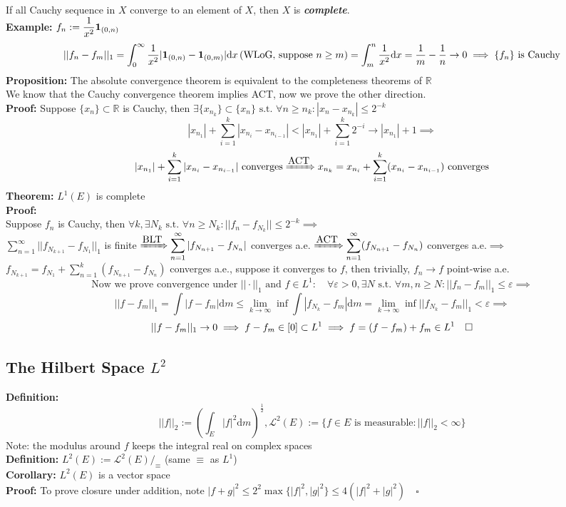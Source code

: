 \documentclass{article}
\newcommand{\R}{\mathbb{R}}
\newcommand{\sumninf}{\displaystyle\sum_{n=1}^\infty}
\newcommand{\sumik}{\displaystyle\sum_{i=1}^k}
\newcommand{\sumnk}{\displaystyle\sum_{n=1}^k}
\newcommand{\limkinf}{\displaystyle\lim_{k\to\infty}}
\newcommand{\st}{\mbox{ s.t. }}
\newcommand{\0}{{\bf{0}}}
\newcommand{\1}{{\bf{1}}}
\newcommand{\dif}{\mbox{d}}
\begin{document}
If all Cauchy sequence in $X$ converge to an element of $X$, then $X$ is \textit{\textbf{complete}}.\\
\textbf{Example:} $f_n:=\dfrac{1}{x^2}\1_{(0,n)}$
$$||f_n-f_m||_1=\int_0^\infty\frac{1}{x^2}|\1_{(0,n)}-\1_{(0,m)}|\dif x\,(\mbox{WLoG, suppose }n\geq m)=\int_m^n\frac{1}{x^2}\dif x=\frac{1}{m}-\frac{1}{n}\to0\implies\{f_n\}\mbox{ is Cauchy}$$
\textbf{Proposition:} The absolute convergence theorem is equivalent to the completeness theorems of $\R$\\
We know that the Cauchy convergence theorem implies ACT, now we prove the other direction.\\
\textbf{Proof:} Suppose $\{x_n\}\subset\R$ is Cauchy, then $\exists\{x_{n_k}\}\subset\{x_n\}\st\forall n\geq n_k:|x_n-x_{n_k}|\le2^{-k}$
$$|x_{n_1}|+\sumik|x_{n_i}-x_{n_{i-1}}|<|x_{n_1}|+\sumik2^{-i}\to|x_{n_1}|+1\implies$$
$$|x_{n_1}|+\sumik|x_{n_i}-x_{n_{i-1}}|\mbox{ converges}\xRightarrow{\mbox{ACT}}x_{n_k}=x_{n_i}+\sumik(x_{n_i}-x_{n_{i-1}})\mbox{ converges}$$
\textbf{Theorem:} $L^1(E)$ is complete\\
\textbf{Proof:}\\
Suppose $f_n$ is Cauchy, then $\forall k,\exists N_k\st\forall n\geq N_k:||f_n-f_{N_k}||\le2^{-k}\implies$\\
$\sumninf||f_{N_{k+1}}-f_{N_1}||_1$ is finite $\xRightarrow{\mbox{BLT}}\sumninf|f_{N_{n+1}}-f_{N_n}|$ converges a.e. $\xRightarrow{\mbox{ACT}}\sumninf(f_{N_{n+1}}-f_{N_n})$ converges a.e.$\implies$\\
$f_{N_{k+1}}=f_{N_1}+\sumnk(f_{N_{n+1}}-f_{N_n})$ converges a.e., suppose it converges to $f$, then trivially, $f_n\to f$ point-wise a.e.
$$\mbox{Now we prove convergence under }||\cdot||_1\mbox{ and }f\in L^1:\quad\forall\varepsilon>0,\exists N\st\forall m,n\geq N:||f_n-f_m||_1\le\varepsilon\implies$$
$$||f-f_m||_1=\int|f-f_m|\dif m\le\limkinf\inf\int|f_{N_k}-f_m|\dif m=\limkinf\inf||f_{N_k}-f_m||_1<\varepsilon\implies$$
$$||f-f_m||_1\to0\implies f-f_m\in[0]\subset L^1\implies f=(f-f_m)+f_m\in L^1\quad\null\square$$
\subsection{The Hilbert Space $L^2$}
\textbf{Definition:}
$$||f||_2:=(\int_E|f|^2\dif m)^\frac{1}{2},\mathcal{L}^2(E):=\{f\in E\mbox{ is measurable}:||f||_2<\infty\}$$
\null\hfill{Note: the modulus around $f$ keeps the integral real on complex spaces}\\
\textbf{Definition:} $L^2(E):=\mathcal{L}^2(E)/_\equiv$ (same $\equiv$ as $L^1$)\\
\textbf{Corollary:} $L^2(E)$ is a vector space\\
\textbf{Proof:}
To prove closure under addition, note $|f+g|^2\le2^2\max\{|f|^2,|g|^2\}\le4(|f|^2+|g|^2)\quad\square$
\end{document}
